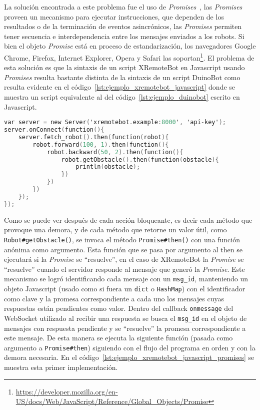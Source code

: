 La solución encontrada a este problema fue el uso de
\textit{Promises}~\citep{ECMA-262},
las \textit{Promises} proveen un mecanismo para ejecutar instrucciones,
que dependen de los resultados o de la terminación de eventos asincrónicos,
las \textit{Promises} permiten tener secuencia e interdependencia entre los
mensajes enviados a los
robots.
Si bien el objeto \textit{Promise} está en proceso de estandarización,
los navegadores Google Chrome, Firefox, Internet Explorer, Opera y Safari las
soportan\footnote{\url{https://developer.mozilla.org/en-US/docs/Web/JavaScript/Reference/Global_Objects/Promise}}.
El problema de esta solución es que la sintaxis de un script XRemoteBot en
Javascript usando \textit{Promises}
resulta bastante distinta de la sintaxis de un script DuinoBot como resulta
evidente
en el código~\ref{lst:ejemplo_xremotebot_javascript} donde se muestra un
script equivalente
al del código~\ref{lst:ejemplo_duinobot} escrito en Javascript.

\begin{lstlisting}[language=C,
caption={Ejemplo de XRemoteBot en Javascript},
label=lst:ejemplo_xremotebot_javascript]
var server = new Server('xremotebot.example:8000', 'api-key');
server.onConnect(function(){
    server.fetch_robot().then(function(robot){
        robot.forward(100, 1).then(function(){
            robot.backward(50, 2).then(function(){
                robot.getObstacle().then(function(obstacle){
                    println(obstacle);
                })
            })
        })
    });
});
\end{lstlisting}

Como se puede ver después de cada acción bloqueante, es decir cada método que
provoque una demora, y de cada método que retorne un valor útil, como
\texttt{Robot\#getObstacle()}, se invoca el método \texttt{Promise\#then()} con
una función anónima como argumento. Esta función que se pasa por argumento al
then se ejecutará si la \textit{Promise} se ``resuelve'', en el caso de
XRemoteBot la \textit{Promise} se ``resuelve'' cuando el servidor
responde al mensaje que generó la \textit{Promise}.
Este mecanismo se logró identificando cada mensaje con un \texttt{msg\_id},
manteniendo un objeto Javascript (usado como si fuera un \texttt{dict}
o \texttt{HashMap}) con el identificador como clave y la promesa
correspondiente a cada uno los mensajes cuyas respuestas están pendientes
como valor. Dentro del callback \texttt{onmessage} del WebSocket utilizado
al recibir una respuesta se busca el \texttt{msg\_id} en el objeto de
mensajes con respuesta pendiente y se ``resuelve'' la promesa correspondiente
a este mensaje. De esta manera se ejecuta la siguiente función (pasada como
argumento a \texttt{Promise\#then}) siguiendo con el flujo del programa
en orden y con la demora necesaria. En el
código~\ref{lst:ejemplo_xremotebot_javascript_promises} se muestra esta primer
implementación.



